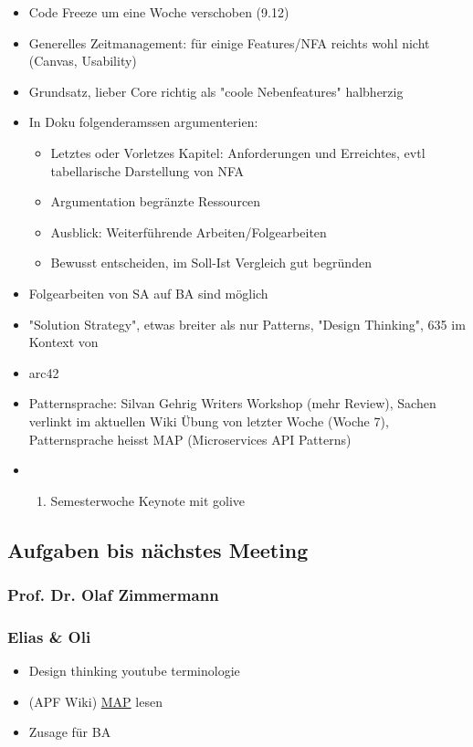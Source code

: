 \begin{itemize}
\item
  Code Freeze um eine Woche verschoben (9.12)
\item
  Generelles Zeitmanagement: für einige Features/NFA reichts wohl nicht
  (Canvas, Usability)
\item
  Grundsatz, lieber Core richtig als "coole Nebenfeatures" halbherzig
\item
  In Doku folgenderamssen argumenterien:

  \begin{itemize}
  
  \item
    Letztes oder Vorletzes Kapitel: Anforderungen und Erreichtes, evtl
    tabellarische Darstellung von NFA
  \item
    Argumentation begränzte Ressourcen
  \item
    Ausblick: Weiterführende Arbeiten/Folgearbeiten
  \item
    Bewusst entscheiden, im Soll-Ist Vergleich gut begründen
  \end{itemize}
\item
  Folgearbeiten von SA auf BA sind möglich
\item
  "Solution Strategy", etwas breiter als nur Patterns, "Design
  Thinking", 635 im Kontext von
\item
  arc42
\item
  Patternsprache: Silvan Gehrig Writers Workshop (mehr Review), Sachen
  verlinkt im aktuellen Wiki Übung von letzter Woche (Woche 7),
  Patternsprache heisst MAP (Microservices API Patterns)
\item
  \begin{enumerate}
  \def\labelenumi{\arabic{enumi}.}
  
  \item
    Semesterwoche Keynote mit golive
  \end{enumerate}
\end{itemize}

\hypertarget{aufgaben-bis-nachstes-meeting}{%
\subsection*{Aufgaben bis nächstes
Meeting}\label{aufgaben-bis-nachstes-meeting}}

\hypertarget{prof.-dr.-olaf-zimmermann}{%
\subsubsection*{Prof. Dr. Olaf
Zimmermann}\label{prof.-dr.-olaf-zimmermann}}

\hypertarget{elias-ux5cux26-oli}{%
\subsubsection*{Elias \& Oli}\label{elias-ux5cux26-oli}}

\begin{itemize}

\item
  Design thinking youtube terminologie
\item
  (APF Wiki) \href{https://wiki.ifs.hsr.ch/APF/wiki.cgi?UebSpezialMAP}{MAP} lesen
\item
  Zusage für BA
\end{itemize}